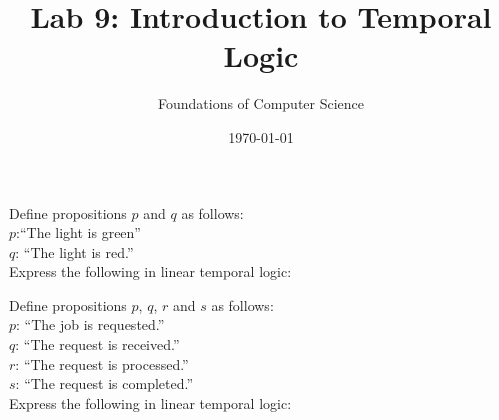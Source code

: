 \documentclass[]{exam}
\title{Lab 9: Introduction to Temporal Logic}
\author{Foundations of Computer Science}
\date{\today}
\begin{document}
\maketitle
\setlength{\columnseprule}{1pt}
\begin{questions} 


\question Define propositions $p$ and $q$ as follows:\\
$p$:``The light is green''\\
$q$: ``The light is red.''\\
Express the following in linear temporal logic:

\question Define propositions $p$, $q$, $r$ and $s$ as follows:\\
 $p$: ``The job is requested.''\\
 $q$: ``The request is received.''\\ 
 $r$: ``The request is processed.''\\
 $s$: ``The request is completed.''\\
Express the following in linear temporal logic:
\begin{parts}

\end{parts}
\end{questions}
\end{document}
